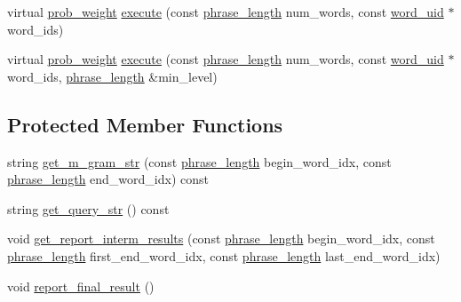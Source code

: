 \begin{DoxyCompactItemize}
\item 
virtual \hyperlink{namespaceuva_1_1smt_1_1bpbd_1_1server_a01e9ea4de9c226f4464862e84ff0bbcc}{prob\+\_\+weight} \hyperlink{classuva_1_1smt_1_1bpbd_1_1server_1_1lm_1_1proxy_1_1lm__fast__query__proxy__local_a64a114e6c001a4ad2e1141f4a1fc2119}{execute} (const \hyperlink{namespaceuva_1_1smt_1_1bpbd_1_1server_af068a19c2e03116caf3e3827a3e40e35}{phrase\+\_\+length} num\+\_\+words, const \hyperlink{namespaceuva_1_1smt_1_1bpbd_1_1server_a6bfe45ba344d65a7fdd7d26156328ddc}{word\+\_\+uid} $\ast$word\+\_\+ids)
\item 
virtual \hyperlink{namespaceuva_1_1smt_1_1bpbd_1_1server_a01e9ea4de9c226f4464862e84ff0bbcc}{prob\+\_\+weight} \hyperlink{classuva_1_1smt_1_1bpbd_1_1server_1_1lm_1_1proxy_1_1lm__fast__query__proxy__local_a79cd7844b6506b73b43150ba5a879e44}{execute} (const \hyperlink{namespaceuva_1_1smt_1_1bpbd_1_1server_af068a19c2e03116caf3e3827a3e40e35}{phrase\+\_\+length} num\+\_\+words, const \hyperlink{namespaceuva_1_1smt_1_1bpbd_1_1server_a6bfe45ba344d65a7fdd7d26156328ddc}{word\+\_\+uid} $\ast$word\+\_\+ids, \hyperlink{namespaceuva_1_1smt_1_1bpbd_1_1server_af068a19c2e03116caf3e3827a3e40e35}{phrase\+\_\+length} \&min\+\_\+level)
\end{DoxyCompactItemize}
\subsection*{Protected Member Functions}
\begin{DoxyCompactItemize}
\item 
string \hyperlink{classuva_1_1smt_1_1bpbd_1_1server_1_1lm_1_1proxy_1_1lm__fast__query__proxy__local_a0cbfce8e996d1bd42d1106d2899e75f9}{get\+\_\+m\+\_\+gram\+\_\+str} (const \hyperlink{namespaceuva_1_1smt_1_1bpbd_1_1server_af068a19c2e03116caf3e3827a3e40e35}{phrase\+\_\+length} begin\+\_\+word\+\_\+idx, const \hyperlink{namespaceuva_1_1smt_1_1bpbd_1_1server_af068a19c2e03116caf3e3827a3e40e35}{phrase\+\_\+length} end\+\_\+word\+\_\+idx) const 
\item 
string \hyperlink{classuva_1_1smt_1_1bpbd_1_1server_1_1lm_1_1proxy_1_1lm__fast__query__proxy__local_a835b3d5747d7fb12d024ecb744305f0e}{get\+\_\+query\+\_\+str} () const 
\item 
void \hyperlink{classuva_1_1smt_1_1bpbd_1_1server_1_1lm_1_1proxy_1_1lm__fast__query__proxy__local_af4b77e946428af9acf3df5090cd2c828}{get\+\_\+report\+\_\+interm\+\_\+results} (const \hyperlink{namespaceuva_1_1smt_1_1bpbd_1_1server_af068a19c2e03116caf3e3827a3e40e35}{phrase\+\_\+length} begin\+\_\+word\+\_\+idx, const \hyperlink{namespaceuva_1_1smt_1_1bpbd_1_1server_af068a19c2e03116caf3e3827a3e40e35}{phrase\+\_\+length} first\+\_\+end\+\_\+word\+\_\+idx, const \hyperlink{namespaceuva_1_1smt_1_1bpbd_1_1server_af068a19c2e03116caf3e3827a3e40e35}{phrase\+\_\+length} last\+\_\+end\+\_\+word\+\_\+idx)
\item 
void \hyperlink{classuva_1_1smt_1_1bpbd_1_1server_1_1lm_1_1proxy_1_1lm__fast__query__proxy__local_a96685ee96a1a8f447b91edd41f51d5aa}{report\+\_\+final\+\_\+result} ()
\end{DoxyCompactItemize}


